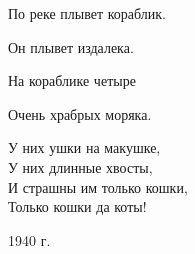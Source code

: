 По реке плывет кораблик. 

Он плывет издалека. 

На кораблике четыре 

Очень храбрых моряка.

\noindent
\hangindent=6cm 
У них ушки на макушке, \\
У них длинные хвосты, \\
И страшны им только кошки, \\
Только кошки да коты!

\begin{flushright}
    1940 г. 
\end{flushright}
